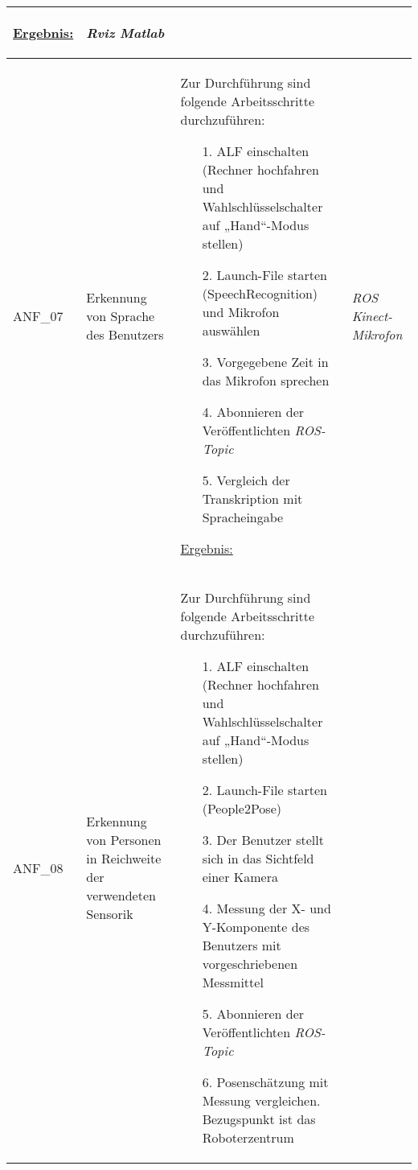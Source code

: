 \documentclass[12pt,a4paper,oneside,numbers=noenddot,captions=tableheading,toc=bibliography,openany,tikz,margin=5mm]{scrbook}
\begin{document}
\begin{longtable}{|p{}|p{}|p{7cm}|p{}|}
\begin{itemize}
		\end{itemize}
	
	\underline{Ergebnis:}\newline
	\newline
	
	\textbf{}\textbf{}	%
	& \textit{Rviz}\newline
	\textit{Matlab}\newline
	\\
	\hline
	
	ANF\_07 & Erkennung von Sprache des Benutzers & Zur Durchführung sind folgende Arbeitsschritte durchzuführen:
	\begin{itemize}
		
		\item[1.]	ALF einschalten (Rechner hochfahren und Wahlschlüsselschalter auf „Hand“-Modus stellen)
		\item[2.]	Launch-File starten (SpeechRecognition) und Mikrofon auswählen
		\item[3.]	Vorgegebene Zeit in das Mikrofon sprechen
		\item[4.]	Abonnieren der Veröffentlichten \textit{ROS-Topic}
		\item[5.]	Vergleich der Transkription mit Spracheingabe
				
	\end{itemize}
	
	\underline{Ergebnis:}\newline
	\newline
	
	\textbf{}	%
	& \textit{ROS}\newline
	\textit{Kinect-Mikrofon}\newline
	\\
	\hline
	
	ANF\_08 & Erkennung von Personen in Reichweite der verwendeten Sensorik & Zur Durchführung sind folgende Arbeitsschritte durchzuführen:
	\begin{itemize}
		
		
		\item[1.]	ALF einschalten (Rechner hochfahren und Wahlschlüsselschalter auf „Hand“-Modus stellen)
		\item[2.]	Launch-File starten (People2Pose)
		\item[3.]	Der Benutzer stellt sich in das Sichtfeld einer Kamera
		\item[4.]	Messung der X- und Y-Komponente des Benutzers mit vorgeschriebenen Messmittel
		\item[5.]	Abonnieren der Veröffentlichten \textit{ROS-Topic} 
		\item[6.]	Posenschätzung mit Messung vergleichen. Bezugspunkt ist das Roboterzentrum


\end{itemize}
\end{longtable}
\end{document}
